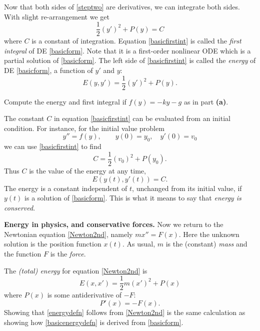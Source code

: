 \documentclass[12pt]{article}
\theoremstyle{definition}
\begin{document}
Now that both sides of \eqref{steptwo} are derivatives, we can integrate both sides.  With slight re-arrangement we get
\begin{equation}
  \frac{1}{2} (y')^2 + P(y) = C  \label{basicfirstint}
\end{equation}
where $C$ is a constant of integration.  Equation \eqref{basicfirstint} is called the \emph{first integral} of DE \eqref{basicform}.  Note that it is a first-order nonlinear ODE which is a partial solution of \eqref{basicform}.  The left side of \eqref{basicfirstint} is called the \emph{energy} of DE \eqref{basicform}, a function of $y'$ and $y$:
\begin{equation}
  E(y,y') = \frac{1}{2} (y')^2 + P(y).  \label{basicenergydefn}
\end{equation}

\begin{prob}
Compute the energy and first integral if $f(y)=-ky-g$ as in part \textbf{(a)}.
\end{prob}

The constant $C$ in equation \eqref{basicfirstint} can be evaluated from an initial condition.  For instance, for the initial value problem
    $$y''=f(y), \qquad y(0)=y_0, \quad y'(0)=v_0$$
we can use \eqref{basicfirstint} to find
    $$C = \frac{1}{2} (v_0)^2 + P(y_0).$$
Thus $C$ is the value of the energy at any time,
    $$E(y(t),y'(t)) = C.$$
The energy is a constant independent of $t$, unchanged from its initial value, if $y(t)$ is a solution of \eqref{basicform}.  This is what it means to say that \emph{energy is conserved}.

\medskip
\textbf{Energy in physics, and conservative forces.}  Now we return to the Newtonian equation \eqref{Newton2nd}, namely $m x'' = F(x)$.  Here the unknown solution is the position function $x(t)$.  As usual, $m$ is the (constant) \emph{mass} and the function $F$ is the \emph{force}.

The \emph{(total) energy} for equation \eqref{Newton2nd} is
\begin{equation}
  E(x,x') = \frac{1}{2} m (x')^2 + P(x)  \label{energydefn}
\end{equation}
where $P(x)$ is some antiderivative of $-F$:
\begin{equation}
P'(x)=-F(x).  \label{potentialfunction}
\end{equation}
Showing that \eqref{energydefn} follows from \eqref{Newton2nd} is the same calculation as showing how \eqref{basicenergydefn} is derived from \eqref{basicform}.
\end{document}
